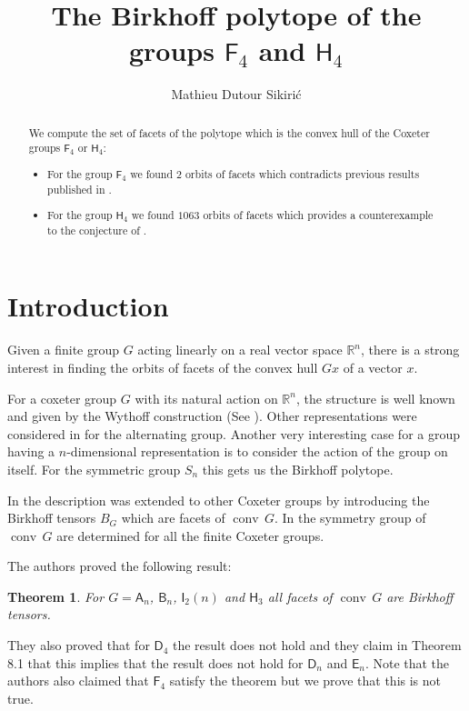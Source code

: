 \documentclass[12pt]{amsart}
\newcommand{\RR}{\ensuremath{\mathbb{R}}}
\newtheorem{theorem}{Theorem}
\DeclareMathOperator{\conv}{conv}
\begin{document}
\author{Mathieu Dutour Sikiri\'c}
\address{Mathieu Dutour Sikiri\'c, Rudjer Boskovi\'c Institute, Bijenicka 54, 10000 Zagreb, Croatia, Fax: +385-1-468-0245}



\title{The Birkhoff polytope of the groups $\mathsf{F}_4$ and $\mathsf{H}_4$}
\date{}

\maketitle

\begin{abstract}
We compute the set of facets of the polytope which is the convex hull
of the Coxeter groups $\mathsf{F}_4$ or $\mathsf{H}_4$:
\begin{itemize}
\item For the group $\mathsf{F}_4$ we found $2$ orbits of facets which
  contradicts previous results published in \cite{birkhoff}.
\item For the group $\mathsf{H}_4$ we found $1063$ orbits of facets which
  provides a counterexample to the conjecture of \cite{birkhoff}.
\end{itemize}
\end{abstract}


\section{Introduction}
Given a finite group $G$ acting linearly on a real vector space $\RR^n$, there
is a strong interest in finding the orbits of facets of the convex
hull $Gx$ of a vector $x$.

For a coxeter group $G$ with its natural action on $\RR^n$, the structure
is well known and given by the Wythoff construction (See \cite{Wythoff}).
Other representations were considered in \cite{Alternahedron} for the
alternating group. Another very interesting case for a group having a
$n$-dimensional representation is to consider the action of the group
on itself. For the symmetric group $S_n$ this gets us the Birkhoff
polytope.

In \cite{ConvexHullsCoxeterGroup,birkhoff} the description was extended
to other Coxeter groups by introducing the Birkhoff tensors $B_G$
which are facets of $\conv\,G$. In \cite{zobin} the symmetry group of
$\conv\, G$ are determined for all the finite Coxeter groups.

The authors proved the following result:
\begin{theorem}
For $G=\mathsf{A}_n$, $\mathsf{B}_n$, $\mathsf{I}_2(n)$ and $\mathsf{H}_3$ all facets of
$\conv\, G$ are Birkhoff tensors.
\end{theorem}
They also proved that for $\mathsf{D}_4$ the result does not hold and
they claim in Theorem 8.1 that this implies that the result does not
hold for $\mathsf{D}_n$ and $\mathsf{E}_n$.
Note that the authors also claimed that $\mathsf{F}_4$ satisfy the theorem but
we prove that this is not true.
\end{document}
